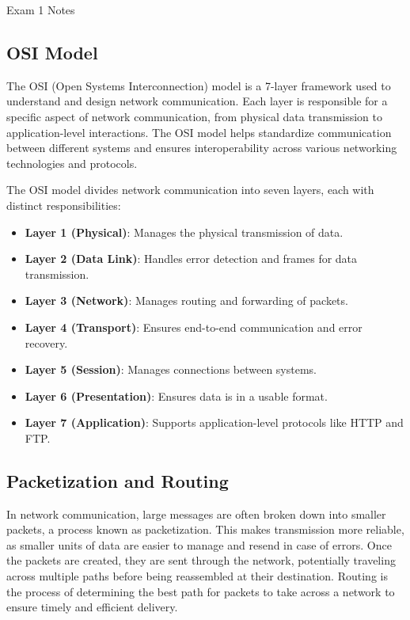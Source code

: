 \begin{examnotes}{Exam 1 Notes}
    \subsection*{OSI Model}
    
    The OSI (Open Systems Interconnection) model is a 7-layer framework used to understand and design network communication. Each layer is responsible for a specific aspect of network communication, 
    from physical data transmission to application-level interactions. The OSI model helps standardize communication between different systems and ensures interoperability across various networking 
    technologies and protocols.
    
    \begin{highlight}
        The OSI model divides network communication into seven layers, each with distinct responsibilities:
        \begin{itemize}
            \item \textbf{Layer 1 (Physical)}: Manages the physical transmission of data.
            \item \textbf{Layer 2 (Data Link)}: Handles error detection and frames for data transmission.
            \item \textbf{Layer 3 (Network)}: Manages routing and forwarding of packets.
            \item \textbf{Layer 4 (Transport)}: Ensures end-to-end communication and error recovery.
            \item \textbf{Layer 5 (Session)}: Manages connections between systems.
            \item \textbf{Layer 6 (Presentation)}: Ensures data is in a usable format.
            \item \textbf{Layer 7 (Application)}: Supports application-level protocols like HTTP and FTP.
        \end{itemize}
    \end{highlight}
    
    \subsection*{Packetization and Routing}
    
    In network communication, large messages are often broken down into smaller packets, a process known as packetization. This makes transmission more reliable, as smaller units of data are easier 
    to manage and resend in case of errors. Once the packets are created, they are sent through the network, potentially traveling across multiple paths before being reassembled at their destination. 
    Routing is the process of determining the best path for packets to take across a network to ensure timely and efficient delivery.
    

\end{examnotes}
